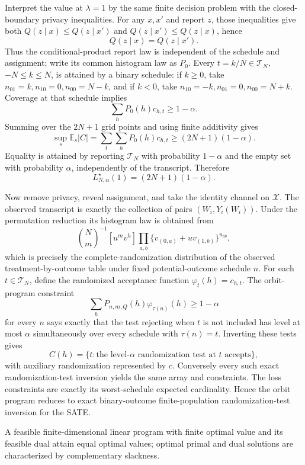 Interpret the value at \(\lambda=1\) by the same finite decision problem with the closed-boundary privacy inequalities.  For any \(x,x'\) and report \(z\), those inequalities give both \(Q(z\mid x)\le Q(z\mid x')\) and \(Q(z\mid x')\le Q(z\mid x)\), hence
\[
 Q(z\mid x)=Q(z\mid x').
\]
Thus the conditional-product report law is independent of the schedule and assignment; write its common histogram law as \(P_0\).  Every \(t=k/N\in\mathcal T_N\), \(-N\le k\le N\), is attained by a binary schedule: if \(k\ge0\), take \(n_{01}=k,n_{10}=0,n_{00}=N-k\), and if \(k<0\), take \(n_{10}=-k,n_{01}=0,n_{00}=N+k\).  Coverage at that schedule implies
\[
 \sum_hP_0(h)c_{h,t}\ge1-\alpha.
\]
Summing over the \(2N+1\) grid points and using finite additivity gives
\[
 \sup_s\mathbb E_s|C|
 =\sum_t\sum_hP_0(h)c_{h,t}
 \ge(2N+1)(1-\alpha).
\]
Equality is attained by reporting \(\mathcal T_N\) with probability \(1-\alpha\) and the empty set with probability \(\alpha\), independently of the transcript.  Therefore
\[
 L^\star_{N,\alpha}(1)=(2N+1)(1-\alpha).
\]

Now remove privacy, reveal assignment, and take the identity channel on \(\mathcal X\).  The observed transcript is exactly the collection of pairs \((W_i,Y_i(W_i))\).  Under the permutation reduction its histogram law is obtained from
\[
 \binom Nm^{-1}[u^mv^h]
 \prod_{a,b}\{v_{(0,a)}+uv_{(1,b)}\}^{n_{ab}},
\]
which is precisely the complete-randomization distribution of the observed treatment-by-outcome table under fixed potential-outcome schedule \(n\).  For each \(t\in\mathcal T_N\), define the randomized acceptance function \(\varphi_t(h)=c_{h,t}\).  The orbit-program constraint
\[
 \sum_hP_{n,m,Q}(h)\varphi_{\tau(n)}(h)\ge1-\alpha
\]
for every \(n\) says exactly that the test rejecting when \(t\) is not included has level at most \(\alpha\) simultaneously over every schedule with \(\tau(n)=t\).  Inverting these tests gives
\[
 C(h)=\{t:\text{the level-}\alpha\text{ randomization test at }t\text{ accepts}\},
\]
with auxiliary randomization represented by \(c\).  Conversely every such exact randomization-test inversion yields the same array and constraints.  The loss constraints are exactly its worst-schedule expected cardinality.  Hence the orbit program reduces to exact binary-outcome finite-population randomization-test inversion for the SATE.

A feasible finite-dimensional linear program with finite optimal value and its feasible dual attain equal optimal values; optimal primal and dual solutions are characterized by complementary slackness.


